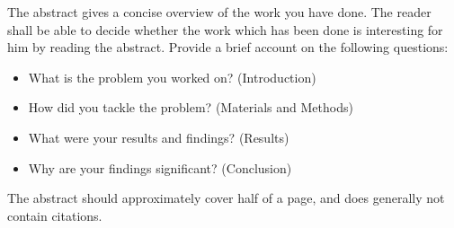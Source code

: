 %

\noindent The abstract gives a concise overview of the work you have done. The reader shall be able to decide whether the work which has been done is interesting for him by reading the abstract. Provide a brief account on the following questions:

\begin{itemize}
    \item What is the problem you worked on? (Introduction)
    \item How did you tackle the problem? (Materials and Methods)
    \item What were your results and findings? (Results)
    \item Why are your findings significant? (Conclusion)
\end{itemize}

\noindent The abstract should approximately cover half of a page, and does generally not contain citations.


